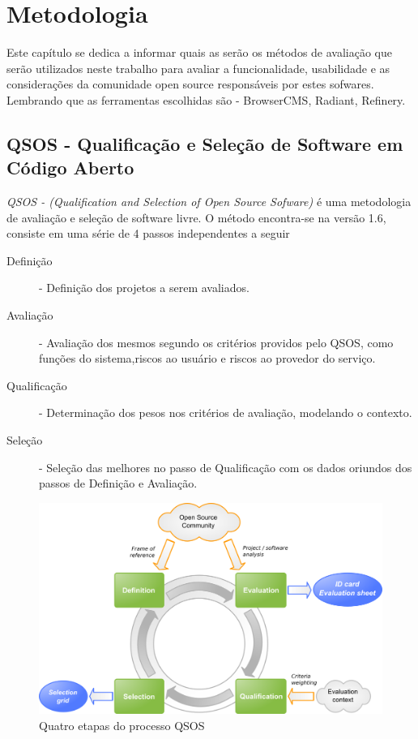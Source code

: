 \chapter{Metodologia}

Este capítulo se dedica a informar quais as serão os métodos de avaliação que serão utilizados neste trabalho para avaliar a funcionalidade, usabilidade e as considerações da comunidade open source responsáveis por estes sofwares. Lembrando que as ferramentas escolhidas são - BrowserCMS, Radiant, Refinery.  

\section{QSOS - Qualificação e Seleção de Software em Código Aberto}

\emph{QSOS - (Qualification and Selection of Open Source Sofware)} é uma metodologia de avaliação e seleção de software livre. O método encontra-se na versão 1.6, consiste em uma série de 4 passos independentes a seguir \cite{qsos_site} 

\begin{description} 
    \item[Definição] - Definição dos projetos a serem avaliados.
    \item[Avaliação] - Avaliação dos mesmos segundo os critérios providos pelo QSOS, como funções do sistema,riscos ao usuário e riscos ao provedor do serviço.
    \item[Qualificação] - Determinação dos pesos nos critérios de avaliação, modelando o contexto.
    \item[Seleção] - Seleção das melhores no passo de Qualificação com os dados  oriundos dos passos de Definição e Avaliação.
\end{description}

\begin{figure}[here]
\includegraphics[width=150mm]{images/4_steps.png}
\caption{Quatro etapas do processo QSOS}
\label{fig:qsos_steps.png}
\end{figure}

